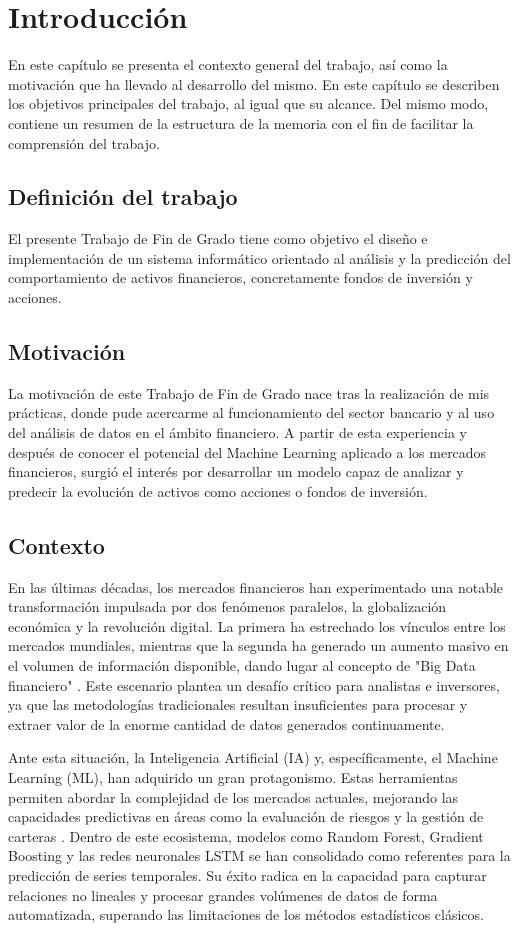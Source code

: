 \chapter{Introducción}
\label{ch:intro}
En este capítulo se presenta el contexto general del trabajo, así como la motivación que ha llevado al desarrollo del mismo. En este capítulo se describen los objetivos principales del trabajo, al igual que su alcance. Del mismo modo, contiene un resumen de la estructura de la memoria con el fin de facilitar la comprensión del trabajo.

\section{Definición del trabajo}
El presente Trabajo de Fin de Grado tiene como objetivo el diseño e implementación de un sistema informático orientado al análisis y la predicción del comportamiento de activos financieros, concretamente fondos de inversión y acciones.

\section{Motivación}
La motivación de este Trabajo de Fin de Grado nace tras la realización de mis prácticas, donde pude acercarme al funcionamiento del sector bancario y al uso del análisis de datos en el ámbito financiero. A partir de esta experiencia y después de conocer el potencial del Machine Learning aplicado a los mercados financieros, surgió el interés por desarrollar un modelo capaz de analizar y predecir la evolución de activos como acciones o fondos de inversión.

\section{Contexto}
En las últimas décadas, los mercados financieros han experimentado una notable transformación impulsada por dos fenómenos paralelos, la globalización económica y la revolución digital. La primera ha estrechado los vínculos entre los mercados mundiales, mientras que la segunda ha generado un aumento masivo en el volumen de información disponible, dando lugar al concepto de "Big Data financiero" \cite{vancsura2025}. Este escenario plantea un desafío crítico para analistas e inversores, ya que las metodologías tradicionales resultan insuficientes para procesar y extraer valor de la enorme cantidad de datos generados continuamente.

Ante esta situación, la Inteligencia Artificial (IA) y, específicamente, el Machine Learning (ML), han adquirido un gran protagonismo. Estas herramientas permiten abordar la complejidad de los mercados actuales, mejorando las capacidades predictivas en áreas como la evaluación de riesgos y la gestión de carteras \cite{elalami2025}. Dentro de este ecosistema, modelos como Random Forest, Gradient Boosting y las redes neuronales LSTM se han consolidado como referentes para la predicción de series temporales. Su éxito radica en la capacidad para capturar relaciones no lineales y procesar grandes volúmenes de datos de forma automatizada, superando las limitaciones de los métodos estadísticos clásicos.

